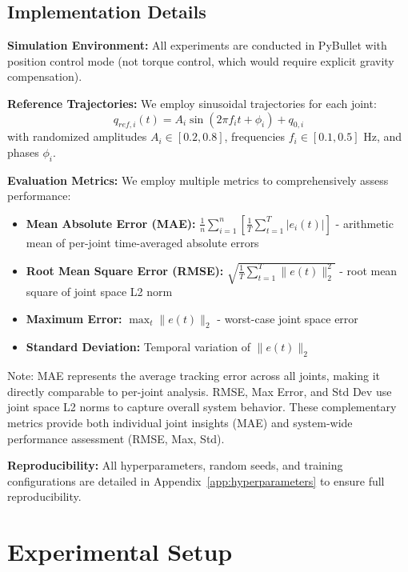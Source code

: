 \documentclass[a4paper]{cas-sc}
\begin{document}
\subsection{Implementation Details}

\textbf{Simulation Environment:} All experiments are conducted in PyBullet \cite{coumans2016pybullet} with position control mode (not torque control, which would require explicit gravity compensation).

\textbf{Reference Trajectories:} We employ sinusoidal trajectories for each joint:
\begin{equation}
    q_{ref,i}(t) = A_i \sin(2\pi f_i t + \phi_i) + q_{0,i}
\end{equation}
with randomized amplitudes $A_i \in [0.2, 0.8]$, frequencies $f_i \in [0.1, 0.5]$ Hz, and phases $\phi_i$.

\textbf{Evaluation Metrics:} We employ multiple metrics to comprehensively assess performance:

\begin{itemize}
    \item \textbf{Mean Absolute Error (MAE):} $\frac{1}{n}\sum_{i=1}^{n}\left[\frac{1}{T}\sum_{t=1}^{T}|e_i(t)|\right]$ - arithmetic mean of per-joint time-averaged absolute errors
    \item \textbf{Root Mean Square Error (RMSE):} $\sqrt{\frac{1}{T}\sum_{t=1}^{T}\|e(t)\|_2^2}$ - root mean square of joint space L2 norm
    \item \textbf{Maximum Error:} $\max_{t} \|e(t)\|_2$ - worst-case joint space error
    \item \textbf{Standard Deviation:} Temporal variation of $\|e(t)\|_2$
\end{itemize}

Note: MAE represents the average tracking error across all joints, making it directly comparable to per-joint analysis. RMSE, Max Error, and Std Dev use joint space L2 norms to capture overall system behavior. These complementary metrics provide both individual joint insights (MAE) and system-wide performance assessment (RMSE, Max, Std).

\textbf{Reproducibility:} All hyperparameters, random seeds, and training configurations are detailed in Appendix~\ref{app:hyperparameters} to ensure full reproducibility.

\section{Experimental Setup}
\label{sec:experiments}
\end{document}
